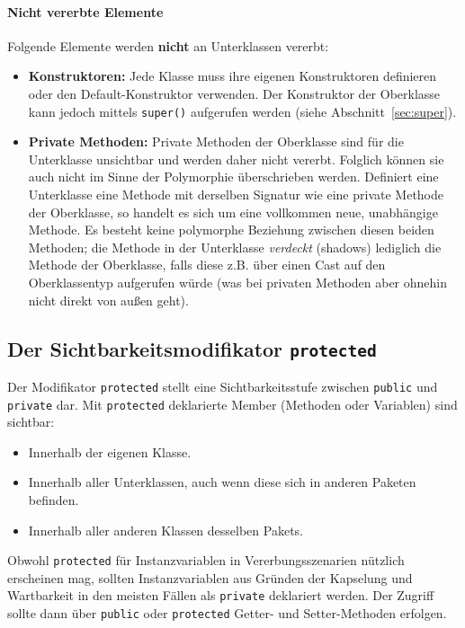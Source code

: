 \paragraph{Nicht vererbte Elemente}
Folgende Elemente werden \textbf{nicht} an Unterklassen vererbt:
\begin{itemize}
  \item \textbf{Konstruktoren:} Jede Klasse muss ihre eigenen Konstruktoren definieren oder den Default-Konstruktor verwenden. Der Konstruktor
        der Oberklasse kann jedoch mittels \texttt{super()} aufgerufen werden (siehe Abschnitt~\ref{sec:super}).
  \item \textbf{Private Methoden:} Private Methoden der Oberklasse sind für die Unterklasse unsichtbar und werden daher nicht vererbt. Folglich
        können sie auch nicht im Sinne der Polymorphie überschrieben werden. Definiert eine Unterklasse eine Methode mit derselben Signatur wie eine
        private Methode der Oberklasse, so handelt es sich um eine vollkommen neue, unabhängige Methode. Es besteht keine polymorphe Beziehung zwischen
        diesen beiden Methoden; die Methode in der Unterklasse \textit{verdeckt} (shadows) lediglich die Methode der Oberklasse, falls diese z.B. über
        einen Cast auf den Oberklassentyp aufgerufen würde (was bei privaten Methoden aber ohnehin nicht direkt von außen geht).
\end{itemize}

\subsection{Der Sichtbarkeitsmodifikator \texttt{protected}}
\label{ssec:protected}

Der Modifikator \texttt{protected} stellt eine Sichtbarkeitsstufe zwischen
\texttt{public} und \texttt{private} dar. Mit \texttt{protected} deklarierte
Member (Methoden oder Variablen) sind sichtbar:
\begin{itemize}
  \item Innerhalb der eigenen Klasse.
  \item Innerhalb aller Unterklassen, auch wenn diese sich in anderen Paketen befinden.
  \item Innerhalb aller anderen Klassen desselben Pakets.
\end{itemize}
Obwohl \texttt{protected} für Instanzvariablen in Vererbungsszenarien nützlich erscheinen mag, sollten Instanzvariablen aus Gründen der Kapselung
und Wartbarkeit in den meisten Fällen als \texttt{private} deklariert werden. Der Zugriff sollte dann über \texttt{public} oder \texttt{protected}
Getter- und Setter-Methoden erfolgen.

